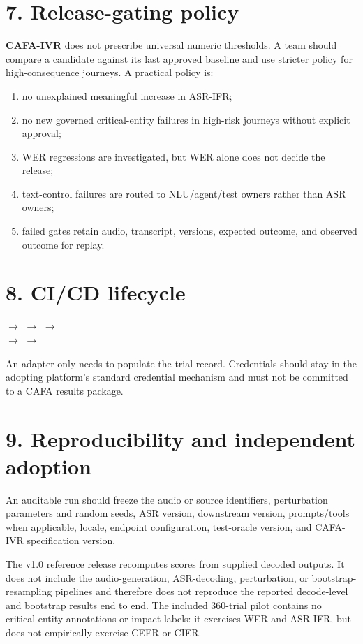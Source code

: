 \documentclass[10pt]{article}
\newcommand{\cafa}{\textbf{CAFA-IVR}}
\begin{document}
\section*{7. Release-gating policy}
\cafa{} does not prescribe universal numeric thresholds. A team should compare a candidate against its last approved baseline and use stricter policy for high-consequence journeys. A practical policy is:
\begin{enumerate}
\item no unexplained meaningful increase in ASR-IFR;
\item no new governed critical-entity failures in high-risk journeys without explicit approval;
\item WER regressions are investigated, but WER alone does not decide the release;
\item text-control failures are routed to NLU/agent/test owners rather than ASR owners;
\item failed gates retain audio, transcript, versions, expected outcome, and observed outcome for replay.
\end{enumerate}

\section*{8. CI/CD lifecycle}
\begin{center}
 $\rightarrow$  $\rightarrow$  $\rightarrow$ \\[4pt]
$\rightarrow$  $\rightarrow$ 
\end{center}

An adapter only needs to populate the trial record. Credentials should stay in the adopting platform's standard credential mechanism and must not be committed to a CAFA results package.

\section*{9. Reproducibility and independent adoption}
An auditable run should freeze the audio or source identifiers, perturbation parameters and random seeds, ASR version, downstream version, prompts/tools when applicable, locale, endpoint configuration, test-oracle version, and CAFA-IVR specification version.

The v1.0 reference release recomputes scores from supplied decoded outputs. It does not include the audio-generation, ASR-decoding, perturbation, or bootstrap-resampling pipelines and therefore does not reproduce the reported decode-level and bootstrap results end to end. The included 360-trial pilot contains no critical-entity annotations or impact labels: it exercises WER and ASR-IFR, but does not empirically exercise CEER or CIER.
\end{document}
